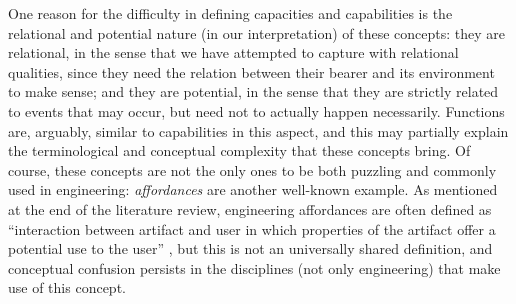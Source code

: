\documentclass[sw]{iosart2x}
\newcommand{\BFO}{\textsc{BFO}\xspace}
\newcommand{\quotes}[1]{`#1'}
\newcommand{\qquotes}[1]{``#1''}
\newcommand{\myComment}[1]{{\unskip \ignorespaces}}
\begin{document}
One reason for the difficulty in defining capacities and capabilities is the relational and potential nature (in our interpretation) of these concepts: they are relational, in the sense that we have attempted to capture with relational qualities, since they need the relation between their bearer and its environment to make sense; and they are potential, in the sense that they are strictly related to events that may occur, but need not to actually happen necessarily.
Functions are, arguably, similar to capabilities in this aspect, 
and this may partially explain the terminological and conceptual complexity that these concepts bring. 
Of course, these concepts are not the only ones to be both puzzling and commonly used in engineering: \textit{affordances} are another well-known example. 
As mentioned at the end of the literature review, engineering affordances are often defined as \qquotes{interaction between artifact and user in which properties of the artifact offer a potential use to the user} \cite{maierAffordanceBasedDesign2009}, but this is not an universally shared definition, and conceptual confusion persists in the disciplines (not only engineering) that make use of this concept.
\end{document}
